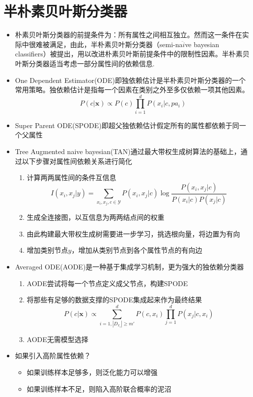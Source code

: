 \section{半朴素贝叶斯分类器}

\begin{itemize}
\item 朴素贝叶斯分类器的前提条件为：所有属性之间相互独立。然而这一条件在实际中很难被满足，由此，半朴素贝叶斯分类器（semi-na$\ddot{i}$ve bayesian classifiers）被提出，用以改进朴素贝叶斯前提条件中的限制性因素。半朴素贝叶斯分类器适当考虑一部分属性间的依赖信息.
\item One Dependent Estimator(ODE)即独依赖估计是半朴素贝叶斯分类器的一个常用策略。独依赖估计是指每一个因素在类别之外至多仅依赖一项其他因素。
\begin{equation}
P(c|\bm{x})\propto P(c)\prod_{i=1}^dP(x_i|c,pa_i)
\end{equation}
\item Super Parent ODE(SPODE)即超父独依赖估计假定所有的属性都依赖于同一个父属性
\item Tree Augmented naive bayesian(TAN)通过最大带权生成树算法的基础上，通过以下步骤对属性间依赖关系进行简化
    \begin{enumerate}
    \item 计算两两属性间的条件互信息
    \begin{equation}I(x_i,x_j|y)=\sum_{x_i,x_j,c\in\mathcal{Y}}P(x_i,x_j|c)\log\frac{P(x_i,x_j|c)}{P(x_i|c)P(x_j|c)}
    \end{equation}
    \item 生成全连接图，以互信息为两两结点间的权重
    \item 由此构建最大带权生成树需要进一步学习，挑选根向量，将边置为有向
    \item 增加类别节点$y$，增加从类别节点到各个属性节点的有向边
\end{enumerate}
\item Averaged ODE(AODE)是一种基于集成学习机制，更为强大的独依赖分类器
    \begin{enumerate}
    \item AODE尝试将每一个节点定义成父节点，构建SPODE
    \item 将那些有足够的数据支撑的SPODE集成起来作为最终结果
    \begin{equation}
    P(c|\bm{x})\propto \sum_{i=1, |D_{x_i}|\ge m'}^dP(c,x_i)\prod_{j=1}^dP(x_j|c,x_i)
    \end{equation}
    \item AODE无需模型选择
    \end{enumerate}
\item 如果引入高阶属性依赖？
    \begin{itemize}
    \item 如果训练样本足够多，则泛化能力可以增强
    \item 如果训练样本不足，则陷入高阶联合概率的泥沼
    \end{itemize}
\end{itemize}

